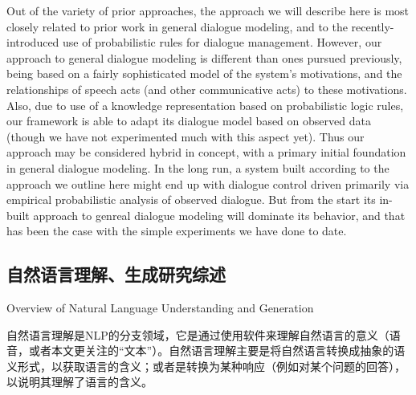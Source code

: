 \begin{enumerate}
\end{enumerate}


Out of the variety of prior approaches, the approach we will describe here is most closely related to prior work in general dialogue modeling, and to the recently-introduced use of probabilistic rules for dialogue management.   However, our approach to general dialogue modeling is different than ones pursued previously, being based on a fairly sophisticated model of the system's motivations, and the relationships of speech acts (and other communicative acts) to these motivations.   Also, due to use of a knowledge representation based on probabilistic logic rules, our framework is able to adapt its dialogue model based on observed data (though we have not experimented much with this aspect yet).  Thus our approach may be considered hybrid in concept, with a primary initial foundation in general dialogue modeling.   In the long run, a system built according to the approach we outline here might end up with dialogue control driven primarily via empirical probabilistic analysis of observed dialogue.  But from the start its in-built approach to genreal dialogue modeling will dominate its behavior, and that has been the case with the simple experiments we have done to date.



\subsection{自然语言理解、生成研究综述}{Overview of Natural Language Understanding and Generation}

自然语言理解是NLP的分支领域，它是通过使用软件来理解自然语言的意义（语音，或者本文更关注的“文本”）。自然语言理解主要是将自然语言转换成抽象的语义形式，以获取语言的含义；或者是转换为某种响应（例如对某个问题的回答），以说明其理解了语言的含义。


